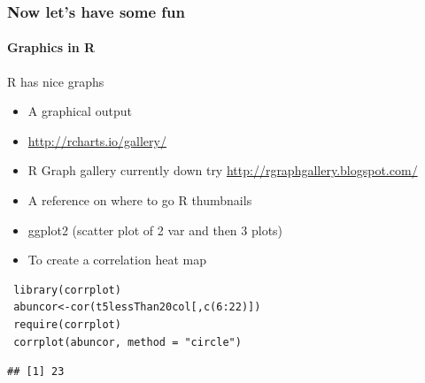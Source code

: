 \documentclass[12pt]{beamer}\usepackage[]{graphicx}\usepackage[]{color}
\makeatletter
\newenvironment{kframe}{%
 \def\at@end@of@kframe{}%
 \ifinner\ifhmode%
  \def\at@end@of@kframe{\end{minipage}}%
  \begin{minipage}{\columnwidth}%
 \fi\fi%
 \def\FrameCommand##1{\hskip\@totalleftmargin \hskip-\fboxsep
 \colorbox{shadecolor}{##1}\hskip-\fboxsep
     \hskip-\linewidth \hskip-\@totalleftmargin \hskip\columnwidth}%
 \MakeFramed {\advance\hsize-\width
   \@totalleftmargin\z@ \linewidth\hsize
   \@setminipage}}%
 {\par\unskip\endMakeFramed%
 \at@end@of@kframe}
\newenvironment{knitrout}{}{} %
\makeatother
\begin{document}
\begin{frame}[fragile]
  \frametitle{Now let's have some fun}
  \framesubtitle{Graphics in R}
\begin{block}{R has nice graphs}
\begin{itemize}
\item A graphical output
\item \url{http://rcharts.io/gallery/}
\item R Graph gallery currently down try \url{http://rgraphgallery.blogspot.com/}
\item A reference on where to go R thumbnails 
\item ggplot2 (scatter plot of 2 var and then 3 plots)
\item To create a correlation heat map
\end{itemize}
\end{block}  
\begin{lstlisting}
 library(corrplot)
 abuncor<-cor(t5lessThan20col[,c(6:22)])
 require(corrplot)
 corrplot(abuncor, method = "circle")
\end{lstlisting} 

\begin{knitrout}
\color{fgcolor}\begin{kframe}
\begin{verbatim}
## [1] 23
\end{verbatim}


{\ttfamily\noindent\itshape\color{messagecolor}{\#\# Loading required package: corrplot}}\end{kframe}
\end{knitrout}

\end{frame}
 
\end{document}
